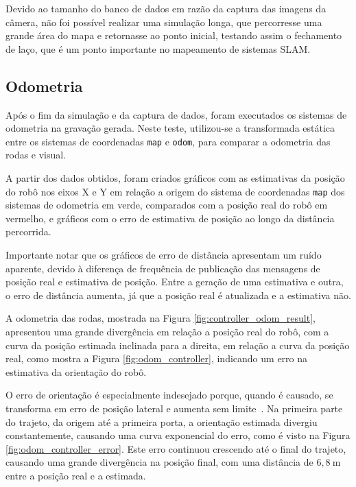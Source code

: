 \documentclass[repeatfields,xlists,xpacks,oneside,yearsonly]{ufrgscca}
\begin{document}
Devido ao tamanho do banco de dados em razão da captura das imagens
da câmera, não foi possível realizar uma simulação longa, que
percorresse uma grande área do mapa e retornasse ao ponto inicial,
testando assim o fechamento de laço, que é um ponto importante no
mapeamento de sistemas SLAM.

\subsection{Odometria}

Após o fim da simulação e da captura de dados, foram executados os
sistemas de odometria na gravação gerada. Neste teste, utilizou-se a
transformada estática entre os sistemas de coordenadas \texttt{map} e
\texttt{odom}, para comparar a odometria das rodas e visual.

A partir dos dados obtidos, foram criados gráficos com as estimativas
da posição do robô nos eixos X e Y em relação a origem do sistema de
coordenadas \texttt{map} dos sistemas de odometria em verde,
comparados com a posição real do robô em vermelho, e gráficos com o
erro de estimativa de posição ao longo da distância percorrida.

Importante notar que os gráficos de erro de distância apresentam um
ruído aparente, devido à diferença de frequência de publicação das
mensagens de posição real e estimativa de posição. Entre a geração de
uma estimativa e outra, o erro de distância aumenta, já que a posição
real é atualizada e a estimativa não.

A odometria das rodas, mostrada na Figura
\ref{fig:controller_odom_result}, apresentou uma grande divergência
em relação a posição real do robô, com a curva da posição estimada
inclinada para a direita, em relação a curva da posição real, como
mostra a Figura \ref{fig:odom_controller}, indicando um erro na
estimativa da orientação do robô.

O erro de orientação é especialmente indesejado porque, quando é
causado, se transforma em erro de posição lateral e aumenta sem
limite~\cite{borenstein}. Na primeira parte do trajeto, da origem até
a primeira porta, a orientação estimada divergiu constantemente,
causando uma curva exponencial do erro, como é visto na Figura
\ref{fig:odom_controller_error}. Este erro continuou crescendo até o
final do trajeto, causando uma grande divergência na posição final,
com uma distância de $6,8~\si{\meter}$ entre a posição real e a
estimada.
\end{document}
